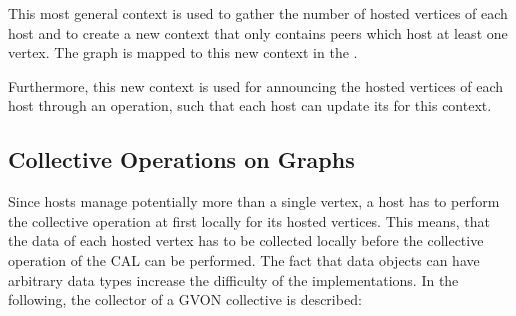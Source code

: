 This most general context is used to gather the number of hosted
vertices of each host and to create a new context that only contains
peers which host at least one vertex. The graph is mapped to this new
context in the .

Furthermore, this new context is used for announcing the hosted
vertices of each host through an  operation, such that
each host can update its  for this context.

\subsection{Collective Operations on Graphs}
\label{sec:gvon_collective}

Since hosts manage potentially more than a single vertex, a host has
to perform the collective operation at first locally for its hosted
vertices. This means, that the data of each hosted vertex has to be
collected locally before the collective operation of the CAL can be
performed. The fact that data objects can have arbitrary data types
increase the difficulty of the implementations.  In the following, the
collector of a GVON collective is described:

